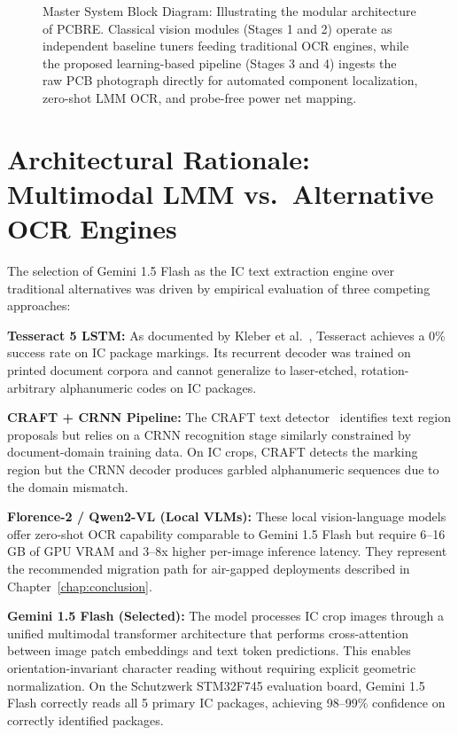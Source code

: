 \documentclass[12pt,a4paper]{report}
\begin{document}
\begin{figure}[!ht]
{%
}
\caption{Master System Block Diagram: Illustrating the modular architecture of PCBRE. Classical vision modules (Stages 1 and 2) operate as independent baseline tuners feeding traditional OCR engines, while the proposed learning-based pipeline (Stages 3 and 4) ingests the raw PCB photograph directly for automated component localization, zero-shot LMM OCR, and probe-free power net mapping.}
\label{fig:tikz_pipeline}
\end{figure}


\section{Architectural Rationale: Multimodal LMM vs.\ Alternative OCR Engines}
\label{sec:arch_rationale}

The selection of Gemini 1.5 Flash as the IC text extraction engine over traditional alternatives was driven by empirical evaluation of three competing approaches:

\textbf{Tesseract 5 LSTM:} As documented by Kleber et al.~\cite{kleber2017woot}, Tesseract achieves a 0\% success rate on IC package markings. Its recurrent decoder was trained on printed document corpora and cannot generalize to laser-etched, rotation-arbitrary alphanumeric codes on IC packages.

\textbf{CRAFT + CRNN Pipeline:} The CRAFT text detector~\cite{kleber2017woot} identifies text region proposals but relies on a CRNN recognition stage similarly constrained by document-domain training data. On IC crops, CRAFT detects the marking region but the CRNN decoder produces garbled alphanumeric sequences due to the domain mismatch.

\textbf{Florence-2 / Qwen2-VL (Local VLMs):} These local vision-language models offer zero-shot OCR capability comparable to Gemini 1.5 Flash but require 6--16 GB of GPU VRAM and 3--8x higher per-image inference latency. They represent the recommended migration path for air-gapped deployments described in Chapter~\ref{chap:conclusion}.

\textbf{Gemini 1.5 Flash (Selected):} The model processes IC crop images through a unified multimodal transformer architecture that performs cross-attention between image patch embeddings and text token predictions. This enables orientation-invariant character reading without requiring explicit geometric normalization. On the Schutzwerk STM32F745 evaluation board, Gemini 1.5 Flash correctly reads all 5 primary IC packages, achieving 98--99\% confidence on correctly identified packages.
\end{document}
